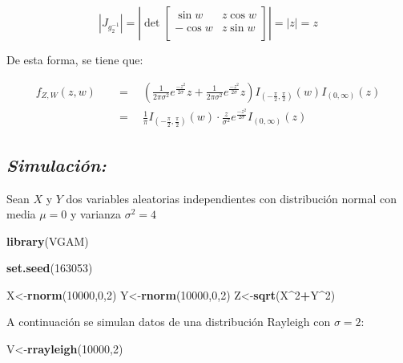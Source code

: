 \documentclass[]{article}
\newenvironment{Shaded}{\begin{snugshade}}{\end{snugshade}}
\newcommand{\KeywordTok}[1]{\textcolor[rgb]{0.13,0.29,0.53}{\textbf{#1}}}
\newcommand{\DecValTok}[1]{\textcolor[rgb]{0.00,0.00,0.81}{#1}}
\newcommand{\OperatorTok}[1]{\textcolor[rgb]{0.81,0.36,0.00}{\textbf{#1}}}
\newcommand{\NormalTok}[1]{#1}
\begin{document}
\begin{equation}
\left| J_{g_2^{-1}}  \right|
=\left| \det 
\begin{bmatrix} 
\sin w &  z\cos w \\
-\cos w &  z\sin w \\
\end{bmatrix}  \right|
=|z|=z
\end{equation}

De esta forma, se tiene que:

\begin{equation}
\begin{split}
f_{Z,W}(z,w) \quad &= \quad \left( \frac{1}{2\pi\sigma^2}e^{\frac{-z^2}{2\sigma}}z + \frac{1}{2\pi\sigma^2}e^{\frac{-z^2}{2\sigma}}z \right) I_{\left(-\frac{\pi}{2},\frac{\pi}{2}\right)}(w) I_{(0,\infty)}(z)\\
&=\quad \frac{1}{\pi}I_{\left(-\frac{\pi}{2},\frac{\pi}{2}\right)}(w)
\cdot\frac{z}{\sigma^2}e^{\frac{-z^2}{2\sigma}} I_{(0,\infty)}(z)
\end{split}
\end{equation}

\subsection{\texorpdfstring{\emph{Simulación:}}{Simulación:}}\label{simulacion-1}

Sean \(X\) y \(Y\) dos variables aleatorias independientes con
distribución normal con media \(\mu=0\) y varianza \(\sigma^2=4\)

\begin{Shaded}
\begin{Highlighting}[]
\KeywordTok{library}\NormalTok{(VGAM)}

\KeywordTok{set.seed}\NormalTok{(}\DecValTok{163053}\NormalTok{)}

\NormalTok{X<-}\KeywordTok{rnorm}\NormalTok{(}\DecValTok{10000}\NormalTok{,}\DecValTok{0}\NormalTok{,}\DecValTok{2}\NormalTok{)}
\NormalTok{Y<-}\KeywordTok{rnorm}\NormalTok{(}\DecValTok{10000}\NormalTok{,}\DecValTok{0}\NormalTok{,}\DecValTok{2}\NormalTok{)}
\NormalTok{Z<-}\KeywordTok{sqrt}\NormalTok{(X}\OperatorTok{^}\DecValTok{2}\OperatorTok{+}\NormalTok{Y}\OperatorTok{^}\DecValTok{2}\NormalTok{)}
\end{Highlighting}
\end{Shaded}

A continuación se simulan datos de una distribución Rayleigh con
\(\sigma=2\):

\begin{Shaded}
\begin{Highlighting}[]
\NormalTok{V<-}\KeywordTok{rrayleigh}\NormalTok{(}\DecValTok{10000}\NormalTok{,}\DecValTok{2}\NormalTok{)}
\end{Highlighting}
\end{Shaded}
\end{document}
